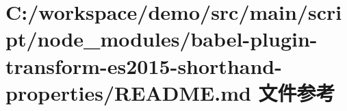 \hypertarget{node__modules_2babel-plugin-transform-es2015-shorthand-properties_2_r_e_a_d_m_e_8md}{}\section{C\+:/workspace/demo/src/main/script/node\+\_\+modules/babel-\/plugin-\/transform-\/es2015-\/shorthand-\/properties/\+R\+E\+A\+D\+ME.md 文件参考}
\label{node__modules_2babel-plugin-transform-es2015-shorthand-properties_2_r_e_a_d_m_e_8md}
